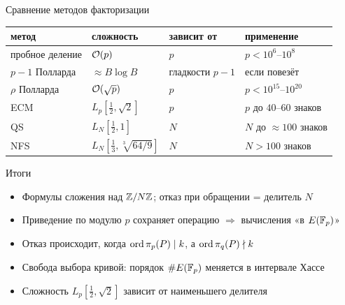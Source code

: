\documentclass{ca-slides}
\begin{document}
\begin{canvasframe}[shrink=6]{Сравнение методов факторизации}
  \centering
  \renewcommand{\arraystretch}{1.2}
  \begin{tabular}{l|l|l|l}
    метод & сложность & зависит от & применение \\ \hline
    пробное деление & $\mathcal{O}(p)$ & $p$ & $p < 10^{6}$--$10^{8}$ \\
    $p - 1$ Полларда & $\approx B \log B$ & гладкости $p - 1$ & если повезёт \\
    $\rho$ Полларда & $\mathcal{O}(\sqrt p)$ & $p$ & $p < 10^{15}$--$10^{20}$ \\
    ECM & $L_p[\frac12, \sqrt 2]$ & $p$ & $p$ до $40$--$60$ знаков \\
    QS & $L_N[\frac12, 1]$ & $N$ & $N$ до $\approx 100$ знаков \\
    NFS & $L_N[\frac13, \sqrt[3]{64/9}]$ & $N$ & $N > 100$ знаков
  \end{tabular}
\end{canvasframe}

\begin{canvasframe}{Итоги}
  \begin{itemize}
    \item Формулы сложения над $\mathbb{Z}/N\mathbb{Z}$; отказ при обращении = делитель $N$
    \item Приведение по модулю $p$ сохраняет операцию $\Rightarrow$ вычисления «в $E(\mathbb{F}_p)$»
    \item Отказ происходит, когда $\operatorname{ord} \pi_p(P) \mid k$, а $\operatorname{ord} \pi_q(P) \nmid k$
    \item Свобода выбора кривой: порядок $\#E(\mathbb{F}_p)$ меняется в интервале Хассе
    \item Сложность $L_p[\frac12, \sqrt 2]$ зависит от наименьшего делителя
  \end{itemize}
\end{canvasframe}
\end{document}
